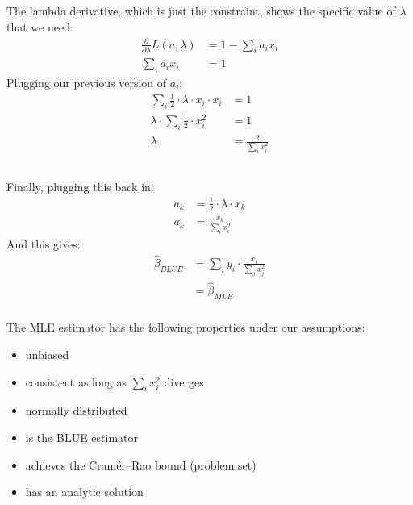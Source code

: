 \begin{frame}[fragile] \frametitle{}

The lambda derivative, which is just the constraint, shows the specific
value of $\lambda$ that we need:
\begin{align*}
\frac{\partial}{\partial \lambda}  L(a,\lambda) &= 1 - \sum_i a_i x_i \\
\sum_i a_i x_i &= 1
\end{align*}
\pause Plugging our previous version of $a_i$:
\begin{align*}
\sum_i \frac{1}{2} \cdot \lambda \cdot x_i \cdot x_i &= 1 \\
\lambda \cdot \sum_i \frac{1}{2} \cdot x_i^2 &= 1 \\
\lambda &= \frac{2}{\sum_i x_i^2} \\
\end{align*}

\end{frame}

\begin{frame}[fragile] \frametitle{}

Finally, plugging this back in:
\begin{align*}
a_k &= \frac{1}{2} \cdot \lambda \cdot x_k \\
a_k &= \frac{x_k}{\sum_i x_i^2}
\end{align*}
\pause And this gives:
\begin{align*}
\widehat{\beta}_{BLUE} &= \sum_i y_i \cdot \frac{x_i}{\sum_j x_j^2} \\
&= \widehat{\beta}_{MLE}
\end{align*}

\end{frame}

\begin{frame}[fragile] \frametitle{}

The MLE estimator has the following properties under our
assumptions:
\begin{itemize}
\item unbiased \pause
\item consistent as long as $\sum_i x_i^2$ diverges \pause
\item normally distributed \pause
\item is the BLUE estimator \pause
\item achieves the Cramér–Rao bound (problem set) \pause
\item has an analytic solution
\end{itemize}

\end{frame}


